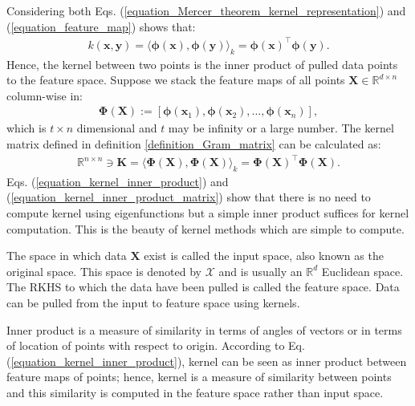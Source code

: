 \documentclass[lang=cn,10pt]{gorgeousnbook}
\numberwithin{equation}{section}%
\numberwithin{figure}{section}%
\begin{document}
Considering both Eqs. (\ref{equation_Mercer_theorem_kernel_representation}) and (\ref{equation_feature_map}) shows that:
\begin{align}\label{equation_kernel_inner_product}
k(\boldsymbol{x}, \boldsymbol{y}) = \big\langle \boldsymbol{\phi}(\boldsymbol{x}), \boldsymbol{\phi}(\boldsymbol{y}) \big\rangle_k = \boldsymbol{\phi}(\boldsymbol{x})^\top \boldsymbol{\phi}(\boldsymbol{y}). 
\end{align}
Hence, the kernel between two points is the inner product of pulled data points to the feature space. 
Suppose we stack the feature maps of all points $\boldsymbol{X} \in \mathbb{R}^{d \times n}$ column-wise in:
\begin{align}\label{equation_Phi_X_pulled_matrix}
\boldsymbol{\Phi}(\boldsymbol{X}) := [\boldsymbol{\phi}(\boldsymbol{x}_1), \boldsymbol{\phi}(\boldsymbol{x}_2), \dots, \boldsymbol{\phi}(\boldsymbol{x}_n)],
\end{align}
which is $t \times n$ dimensional and $t$ may be infinity or a large number. 
The kernel matrix defined in definition \ref{definition_Gram_matrix} can be calculated as:
\begin{align}\label{equation_kernel_inner_product_matrix}
\mathbb{R}^{n \times n} \ni \boldsymbol{K} = \big\langle \boldsymbol{\Phi}(\boldsymbol{X}), \boldsymbol{\Phi}(\boldsymbol{X}) \big\rangle_k =  \boldsymbol{\Phi}(\boldsymbol{X})^\top \boldsymbol{\Phi}(\boldsymbol{X}).
\end{align}
Eqs. (\ref{equation_kernel_inner_product}) and (\ref{equation_kernel_inner_product_matrix}) show that there is no need to compute kernel using eigenfunctions but a simple inner product suffices for kernel computation. This is the beauty of kernel methods which are simple to compute. 

\begin{definition}
The space in which data $\boldsymbol{X}$ exist is called the input space, also known as the original space. This space is denoted by $\mathcal{X}$ and is usually an $\mathbb{R}^d$ Euclidean space. The RKHS to which the data have been pulled is called the feature space. Data can be pulled from the input to feature space using kernels. 
\end{definition}

\begin{remark}\label{remark_kernel_is_similarity}
Inner product is a measure of similarity in terms of angles of vectors or in terms of location of points with respect to origin. According to Eq. (\ref{equation_kernel_inner_product}), kernel can be seen as inner product between feature maps of points; hence, kernel is a measure of similarity between points and this similarity is computed in the feature space rather than input space. 
\end{remark}
\end{document}
